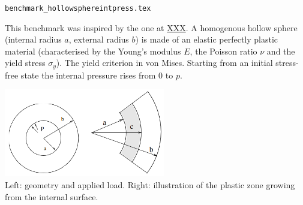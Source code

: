 \begin{flushright} {\tiny {\color{gray} \tt benchmark\_hollowsphereintpress.tex}} \end{flushright}

This benchmark was inspired by the one at \url{XXX}. 
A homogenous hollow sphere (internal radius $a$, external radius $b$) is made of an elastic 
perfectly plastic material (characterised by the Young's modulus $E$, the Poisson ratio $\nu$ and
the yield stress $\sigma_y$). The yield criterion in von Mises. 
Starting from an initial stress-free state the internal pressure rises from $0$ to $p$.

\begin{center}
\includegraphics[width=7cm]{images/benchmark_hollowsphereintpress/sphere}\\
{\captionfont Left: geometry and applied load. Right: illustration of the plastic zone
growing from the internal surface.}
\end{center}

